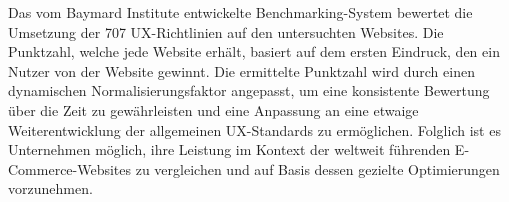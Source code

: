 Das vom Baymard Institute entwickelte Benchmarking-System bewertet die Umsetzung der 707 UX-Richtlinien auf den untersuchten Websites. Die Punktzahl, welche jede Website erhält, basiert auf dem ersten Eindruck, den ein Nutzer von der Website gewinnt. Die ermittelte Punktzahl wird durch einen dynamischen Normalisierungsfaktor angepasst, um eine konsistente Bewertung über die Zeit zu gewährleisten und eine Anpassung an eine etwaige Weiterentwicklung der allgemeinen UX-Standards zu ermöglichen. Folglich ist es Unternehmen möglich, ihre Leistung im Kontext der weltweit führenden E-Commerce-Websites zu vergleichen und auf Basis dessen gezielte Optimierungen vorzunehmen.

